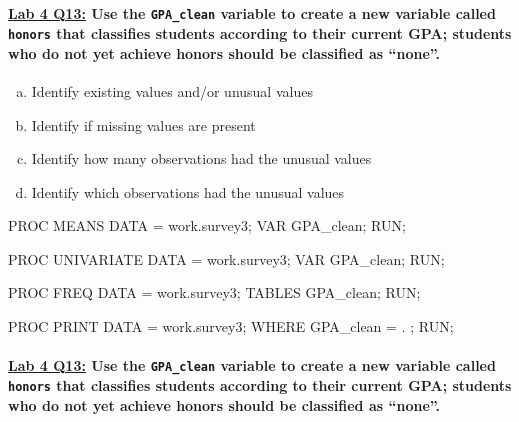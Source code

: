 \subsection{}
\begin{frame}
\end{frame}

\begin{frame}[fragile]
\framesubtitle{\underline{Lab 4 Q13:} Use the \texttt{GPA\_clean} variable to create a new variable called \texttt{honors} that classifies students according to their current GPA; students who do not yet achieve honors should be classified as ``none''.}
\begin{enumerate}[a.]
\item Identify existing values and/or unusual values
\item Identify if missing values are present
\item Identify how many observations had the unusual values
\item Identify which observations had the unusual values
\end{enumerate}
\vskip10pt
\footnotesize
\begin{code}{.0}
PROC MEANS DATA = work.survey3; VAR GPA_clean; RUN;

PROC UNIVARIATE DATA = work.survey3; VAR GPA_clean; RUN;

PROC FREQ DATA = work.survey3; TABLES GPA_clean; RUN;

PROC PRINT DATA = work.survey3; WHERE GPA_clean = . ; RUN;
\end{code}
\emp
\end{frame}


\begin{frame}[fragile]
\framesubtitle{\underline{Lab 4 Q13:} Use the \texttt{GPA\_clean} variable to create a new variable called \texttt{honors} that classifies students according to their current GPA; students who do not yet achieve honors should be classified as ``none''.}
\footnotesize
{}
\emp
\end{frame}

